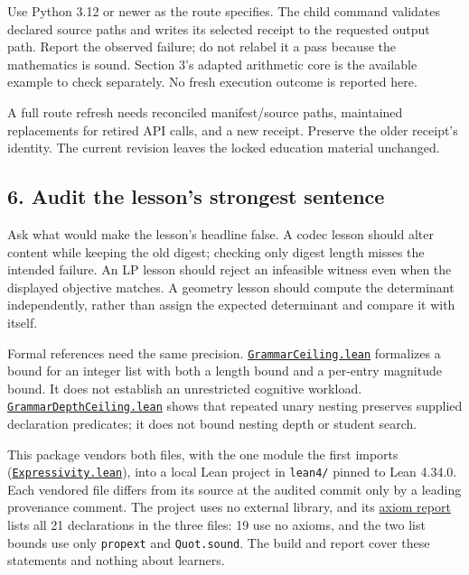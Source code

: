 \documentclass[
  11pt,
]{article}
\newcommand{\passthrough}[1]{#1}
\begin{document}
Use Python 3.12 or newer as the route specifies. The child command
validates declared source paths and writes its selected receipt to the
requested output path. Report the observed failure; do not relabel it a
pass because the mathematics is sound. Section 3's adapted arithmetic
core is the available example to check separately. No fresh execution
outcome is reported here.

A full route refresh needs reconciled manifest/source paths, maintained
replacements for retired API calls, and a new receipt. Preserve the
older receipt's identity. The current revision leaves the locked
education material unchanged.

\subsection{6. Audit the lesson's strongest
sentence}\label{audit-the-lessons-strongest-sentence}

Ask what would make the lesson's headline false. A codec lesson should
alter content while keeping the old digest; checking only digest length
misses the intended failure. An LP lesson should reject an infeasible
witness even when the displayed objective matches. A geometry lesson
should compute the determinant independently, rather than assign the
expected determinant and compare it with itself.

Formal references need the same precision.
\href{https://github.com/dbccpage/the_symbol_game/blob/52cb5457f6c485ba548cfd292f6012a941ed22cf/atlas/coda_atlas/symbol_game/007_pfp_executable_lessons_and_evidence_boundaries/lean4/GrammarCeiling.lean}{\mbox{\nolinkurl{GrammarCeiling.lean}}}
formalizes a bound for an integer list with both a length bound and a
per-entry magnitude bound. It does not establish an unrestricted
cognitive workload.
\href{https://github.com/dbccpage/the_symbol_game/blob/52cb5457f6c485ba548cfd292f6012a941ed22cf/atlas/coda_atlas/symbol_game/007_pfp_executable_lessons_and_evidence_boundaries/lean4/GrammarDepthCeiling.lean}{\mbox{\nolinkurl{GrammarDepthCeiling.lean}}}
shows that repeated unary nesting preserves supplied declaration
predicates; it does not bound nesting depth or student search.

This package vendors both files, with the one module the first imports
(\href{https://github.com/dbccpage/the_symbol_game/blob/52cb5457f6c485ba548cfd292f6012a941ed22cf/atlas/coda_atlas/symbol_game/007_pfp_executable_lessons_and_evidence_boundaries/lean4/Expressivity.lean}{\mbox{\nolinkurl{Expressivity.lean}}}),
into a local Lean project in \passthrough{\lstinline!lean4/!} pinned to
Lean 4.34.0. Each vendored file differs from its source at the audited
commit only by a leading provenance comment. The project uses no
external library, and its
\href{https://github.com/dbccpage/the_symbol_game/blob/52cb5457f6c485ba548cfd292f6012a941ed22cf/atlas/coda_atlas/symbol_game/007_pfp_executable_lessons_and_evidence_boundaries/lean4/axiom_report.txt}{axiom
report} lists all 21 declarations in the three files: 19 use no axioms,
and the two list bounds use only \passthrough{\lstinline!propext!} and
\passthrough{\lstinline!Quot.sound!}. The build and report cover these
statements and nothing about learners.
\end{document}
